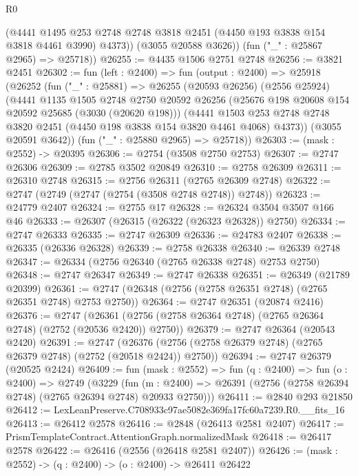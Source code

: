\begin{lexlean}{R0}
\begin{coremodule}
          (@4441
            @1495
            @253
            @2748
            @2748
            @3818
            @2451
            (@4450 @193 @3838 @154 @3818 @4461 @3990)
            @4373))
        (@3055 @20588 @3626))
      (fun ("_" : @25867 @2965) => @25718))
@26255 := @4435 @1506 @2751 @2748
@26256 := @3821 @2451
@26302 := fun (left : @2400) =>
  fun (output : @2400) =>
  @25918
    (@26252
      (fun ("_" : @25881) =>
      @26255
        (@20593 @26256)
        (@2556 @25924)
        (@4441
          @1135
          @1505
          @2748
          @2750
          @20592
          @26256
          (@25676 @198 @20608 @154 @20592 @25685 (@3030 (@20620 @198)))
          (@4441
            @1503
            @253
            @2748
            @2748
            @3820
            @2451
            (@4450 @198 @3838 @154 @3820 @4461 @4068)
            @4373))
        (@3055 @20591 @3642))
      (fun ("_" : @25880 @2965) => @25718))
@26303 := (mask : @2552) -> @20395
@26306 := @2754 (@3508 @2750 @2753)
@26307 := @2747 @26306
@26309 := @2785 @3502 @20849
@26310 := @2758 @26309
@26311 := @26310 @2748
@26315 := @2756 @26311 (@2765 @26309 @2748)
@26322 := @2747 (@2749 (@2747 (@2754 (@3508 @2748 @2748)) @2748))
@26323 := @24779 @2407
@26324 := @2755 @17
@26328 := @26324 @3504 @3507 @166 @46
@26333 := @26307 (@26315 (@26322 (@26323 @26328)) @2750)
@26334 := @2747 @26333
@26335 := @2747 @26309
@26336 := @24783 @2407
@26338 := @26335 (@26336 @26328)
@26339 := @2758 @26338
@26340 := @26339 @2748
@26347 := @26334 (@2756 @26340 (@2765 @26338 @2748) @2753 @2750)
@26348 := @2747 @26347
@26349 := @2747 @26338
@26351 := @26349 (@21789 @20399)
@26361 := @2747 (@26348 (@2756 (@2758 @26351 @2748) (@2765 @26351 @2748) @2753 @2750))
@26364 := @2747 @26351 (@20874 @2416)
@26376 := @2747
    (@26361 (@2756 (@2758 @26364 @2748) (@2765 @26364 @2748) (@2752 (@20536 @2420)) @2750))
@26379 := @2747 @26364 (@20543 @2420)
@26391 := @2747
    (@26376 (@2756 (@2758 @26379 @2748) (@2765 @26379 @2748) (@2752 (@20518 @2424)) @2750))
@26394 := @2747 @26379 (@20525 @2424)
@26409 := fun (mask : @2552) =>
  fun (q : @2400) =>
  fun (o : @2400) =>
  @2749
    (@3229
      (fun (m : @2400) => @26391 (@2756 (@2758 @26394 @2748) (@2765 @26394 @2748) @20933 @2750)))
@26411 := @2840 @293 @21850
@26412 := LexLeanPreserve.C708933c97ae5082e369fa17fc60a7239.R0.__fits_16
@26413 := @26412 @2578
@26416 := @2848 (@26413 @2581 @2407)
@26417 := PrismTemplateContract.AttentionGraph.normalizedMask
@26418 := @26417 @2578
@26422 := @26416 (@2556 (@26418 @2581 @2407))
@26426 := (mask : @2552) -> (q : @2400) -> (o : @2400) -> @26411 @26422

\end{coremodule}
\end{lexlean}
